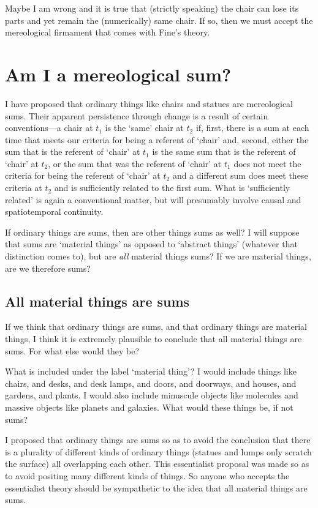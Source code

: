 \documentclass[11pt]{article}
\begin{document}
\begin{spacing}{1.5}
Maybe I am wrong and it is true that (strictly speaking) the chair can
lose its parts and yet remain the (numerically) same chair.  If so,
then we must accept the mereological firmament that comes with Fine's
theory.

\section{Am I a mereological sum?}
\label{i-sum}
I have proposed that ordinary things like chairs and statues are
mereological sums.  Their apparent persistence through change is a
result of certain conventions---a chair at $t_1$ is the `same' chair
at $t_2$ if, first, there is a sum at each time that meets our
criteria for being a referent of `chair' and, second, either the sum
that is the referent of `chair' at $t_1$ is the same sum that is the
referent of `chair' at $t_2$, or the sum that was the referent of
`chair' at $t_1$ does not meet the criteria for being the referent
of `chair' at $t_2$ and a different sum does meet these criteria at
$t_2$ and is sufficiently related to the first sum.  What is
`sufficiently related' is again a conventional matter, but will
presumably involve causal and spatiotemporal continuity.

If ordinary things are sums, then are other things sums as well?  I
will suppose that sums are `material things' as opposed to `abstract
things' (whatever that distinction comes to), but are {\em all}
material things sums?  If we are material things, are we therefore
sums?


\subsection{All material things are sums}
\label{material-sum}
If we think that ordinary things are sums, and that ordinary things
are material things, I think it is extremely plausible to conclude
that all material things are sums.  For what else would they be?

What is included under the label `material thing'?  I would include
things like chairs, and desks, and desk lamps, and doors, and
doorways, and houses, and gardens, and plants.  I would also include
minuscule objects like molecules and massive objects like planets and
galaxies.  What would these things be, if not sums?

I proposed that ordinary things are sums so as to avoid the conclusion
that there is a plurality of different kinds of ordinary things
(statues and lumps only scratch the surface) all overlapping each
other.  This essentialist proposal was made so as to avoid positing
many different kinds of things.  So anyone who accepts the
essentialist theory should be sympathetic to the idea that all
material things are sums.


\end{spacing}
\end{document}
